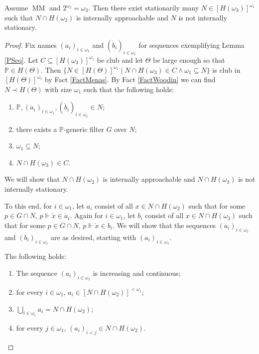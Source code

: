 \documentclass[10pt,a4paper]{amsart}
\DeclareMathOperator{\MM}{MM}
\newcommand{\dP}{\mathbb{P}}
\begin{document}
	\begin{mysen}\label{MMThm}
		Assume $\MM$ and $2^{\omega_2}=\omega_3$. Then there exist stationarily many $N\in[H(\omega_3)]^{\omega_1}$ such that $N\cap H(\omega_2)$ is internally approachable and $N$ is not internally stationary.
	\end{mysen}

	\begin{proof}
		Fix names $(\dot{a}_i)_{i\in\omega_1}$ and $(\dot{b}_i)_{i\in\omega_1}$ for sequences exemplifying Lemma \ref{PSeq}. Let $C\subseteq[H(\omega_3)]^{\omega_1}$ be club and let $\Theta$ be large enough so that $\dP\in H(\Theta)$. Then $\{N\in[H(\Theta)]^{\omega_1}\;|\;N\cap H(\omega_3)\in C\wedge\omega_1\subseteq N\}$ is club in $[H(\Theta)]^{\omega_1}$ by Fact \ref{FactMenas}. By Fact \ref{FactWoodin} we can find $N\prec H(\Theta)$ with size $\omega_1$ such that the following holds:
		
		\begin{enumerate}
			\item $\dP,(\dot{a}_i)_{i\in\omega_1},(\dot{b}_i)_{i\in\omega_1}\in N$;
			\item there exists a $\dP$-generic filter $G$ over $N$;
			\item $\omega_1\subseteq N$;
			\item $N\cap H(\omega_3)\in C$.
		\end{enumerate}
		
		We will show that $N\cap H(\omega_2)$ is internally approachable and $N\cap H(\omega_3)$ is not internally stationary.
		
		To this end, for $i\in\omega_1$, let $a_i$ consist of all $x\in N\cap H(\omega_2)$ such that for some $p\in G\cap N$, $p\Vdash\check{x}\in\dot{a}_i$. Again for $i\in\omega_1$, let $b_i$ consist of all $x\in N\cap H(\omega_3)$ such that for some $p\in G\cap N$, $p\Vdash\check{x}\in\dot{b}_i$. We will show that the sequences $(a_i)_{i\in\omega_1}$ and $(b_i)_{i\in\omega_1}$ are as desired, starting with $(a_i)_{i\in\omega_1}$.
		
		\begin{myclaim}
			The following holds:
			\begin{enumerate}
				\item The sequence $(a_i)_{i\in\omega_1}$ is increasing and continuous;
				\item for every $i\in\omega_1$, $a_i\in[N\cap H(\omega_2)]^{<\omega_1}$;
				\item $\bigcup_{i\in\omega_1}a_i=N\cap H(\omega_2)$;
				\item for every $j\in\omega_1$, $(a_i)_{i<j}\in N\cap H(\omega_2)$.
			\end{enumerate}
		\end{myclaim}
		

\end{proof}
\end{document}
